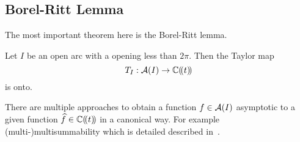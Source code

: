 \subsection{Borel-Ritt Lemma}
\begin{comment}
  \begin{itemize}
    \item \cite[Lem.II.2.2.5]{sabbah_cimpa90}: $T_I$
    \item \textbf{\cite[Th.7.3]{van2003galois}}: $T_I=T_{(a,b)}$
    \item \cite[Th.2.4.1]{Loday2014}: $T_{\mathfrak{s}}$
    \item \cite[4.4.Thm.16]{Balser2000Formal}
  \end{itemize}
\end{comment}
The most important theorem here is the Borel-Ritt lemma.
\begin{thm}
  \label{thm:borel-ritt}
  Let $I$ be an open arc with a opening less than $2\pi$. Then the Taylor map
  \[
    T_{I}:\mathcal{A}(I)\to\mathbb{C}(\!(t)\!)
  \]
  is onto.
\end{thm}
There are multiple approaches to obtain a function $f\in\mathcal{A}(I)$ asymptotic to a
given function $\widehat f\in\mathbb{C}(\!(t)\!)$ in a canonical way. For example
(multi-)multisummability which is detailed described in~\cite{Loday2014}.
